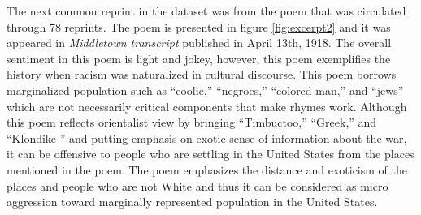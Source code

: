 \documentclass[11pt]{article}
\begin{document}
The next common reprint in the dataset was from the poem that was circulated through 
78 reprints. The poem is presented in figure \ref{fig:excerpt2} and it was
appeared in \textit{Middletown transcript} published in April 13th, 1918.
The overall sentiment in this poem is light and jokey, however, this poem exemplifies the history
when racism was naturalized in cultural discourse. 
This poem borrows marginalized population such as ``coolie,'' ``negroes,'' ``colored man,''
and ``jews'' which are not necessarily critical components that
make rhymes work. Although this poem reflects orientalist view \cite{orientalism1978} by bringing
``Timbuctoo,'' ``Greek,'' and ``Klondike '' and putting emphasis on exotic sense of information about the war,
it can be offensive to people who are settling in the United States from the places
mentioned in the poem. The poem emphasizes the distance and exoticism of the places
and people who are not White and thus it can be considered as micro aggression toward
marginally represented population in the United States.


\end{document}
